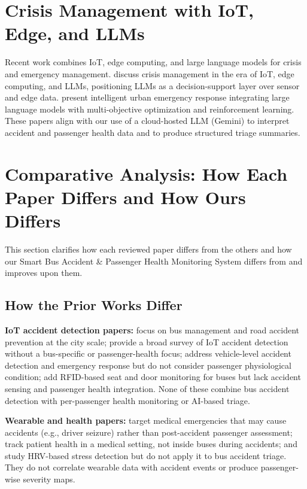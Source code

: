 \documentclass[conference]{IEEEtran}
\begin{document}
\section{Crisis Management with IoT, Edge, and LLMs}

Recent work combines IoT, edge computing, and large language models for crisis and emergency management. \cite{ieee_crisis_iot_edge_llm} discuss crisis management in the era of IoT, edge computing, and LLMs, positioning LLMs as a decision-support layer over sensor and edge data. \cite{ieee_urban_emergency_llm} present intelligent urban emergency response integrating large language models with multi-objective optimization and reinforcement learning. These papers align with our use of a cloud-hosted LLM (Gemini) to interpret accident and passenger health data and to produce structured triage summaries.

\section{Comparative Analysis: How Each Paper Differs and How Ours Differs}

This section clarifies how each reviewed paper differs from the others and how our Smart Bus Accident \& Passenger Health Monitoring System differs from and improves upon them.

\subsection{How the Prior Works Differ}

\textbf{IoT accident detection papers:} \cite{ieee_bus_mgmt} focus on bus management and road accident prevention at the city scale; \cite{ieee_comprehensive_iot_accident} provide a broad survey of IoT accident detection without a bus-specific or passenger-health focus; \cite{ieee_iot_accident_emergency} address vehicle-level accident detection and emergency response but do not consider passenger physiological condition; \cite{ieee_rfid_bus_door} add RFID-based seat and door monitoring for buses but lack accident sensing and passenger health integration. None of these combine bus accident detection with per-passenger health monitoring or AI-based triage.

\textbf{Wearable and health papers:} \cite{ieee_smart_wearable_medical} target medical emergencies that may cause accidents (e.g., driver seizure) rather than post-accident passenger assessment; \cite{ieee_wearable_jacket} track patient health in a medical setting, not inside buses during accidents; \cite{ieee_hrv_stress_wearable} and \cite{ieee_esp32_stress} study HRV-based stress detection but do not apply it to bus accident triage. They do not correlate wearable data with accident events or produce passenger-wise severity maps.
\end{document}
